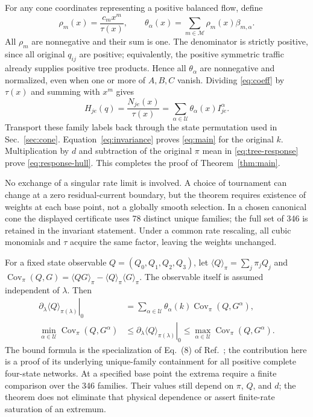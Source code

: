 \documentclass[11pt,a4paper]{article}
\DeclareMathOperator{\Cov}{Cov}
\newcommand{\U}{\mathcal U}
\begin{document}
For any cone coordinates representing a positive balanced flow, define
\begin{equation}
 \rho_m(x)=\frac{c_mx^m}{\tau(x)},\qquad
 \theta_\alpha(x)=\sum_{m\in\mathcal M}\rho_m(x)\beta_{m,\alpha}.
 \label{eq:weights}
\end{equation}
All $\rho_m$ are nonnegative and their sum is one. The denominator is
strictly positive, since all original $q_{ij}$ are positive; equivalently,
the positive symmetric traffic already supplies positive tree products.
Hence all $\theta_\alpha$ are nonnegative and normalized, even when one
or more of $A,B,C$ vanish. Dividing \eqref{eq:coeff} by $\tau(x)$ and
summing with $x^m$ gives
\begin{equation}
 H_{je}(q)=\frac{N_{je}(x)}{\tau(x)}
     =\sum_{\alpha\in\U}\theta_\alpha(x)I^\alpha_{je}.
 \label{eq:finish}
\end{equation}
Transport these family labels back through the state permutation used
in Sec.~\ref{sec:cone}. Equation~\eqref{eq:invariance} proves
\eqref{eq:main} for the original $k$. Multiplication by $d$ and subtraction
of the original $\pi$ mean in \eqref{eq:tree-response} prove
\eqref{eq:response-hull}. This completes the proof of
Theorem~\ref{thm:main}.

No exchange of a singular rate limit is involved. A choice of tournament
can change at a zero residual-current boundary, but the theorem requires
existence of weights at each base point, not a globally smooth selection.
In a chosen canonical cone the displayed certificate uses 78 distinct
unique families; the full set of 346 is retained in the invariant
statement. Under a common rate rescaling, all cubic monomials and
$\tau$ acquire the same factor, leaving the weights unchanged.

For a fixed state observable $Q=(Q_0,Q_1,Q_2,Q_3)$, let
$\langle Q\rangle_\pi=\sum_j\pi_jQ_j$ and
$\Cov_\pi(Q,G)=\langle QG\rangle_\pi-\langle Q\rangle_\pi
\langle G\rangle_\pi$. The observable itself is assumed independent
of $\lambda$. Then
\begin{align}
 \left.\partial_\lambda\langle Q\rangle_{\pi(\lambda)}\right|_0
 &=\sum_{\alpha\in\U}\theta_\alpha(k)\Cov_\pi(Q,G^\alpha),
 \label{eq:covmix}\\
 \min_{\alpha\in\U}\Cov_\pi(Q,G^\alpha)
 &\le\left.\partial_\lambda\langle Q\rangle_{\pi(\lambda)}\right|_0
 \le\max_{\alpha\in\U}\Cov_\pi(Q,G^\alpha).
 \label{eq:bounds}
\end{align}
The bound formula is the specialization of Eq.~(8) of
Ref.~\cite{FancherHorowitz2026}; the contribution here is a proof of its
underlying unique-family containment for all positive complete
four-state networks. At a specified base point the extrema require a
finite comparison over the 346 families. Their values still depend on
$\pi$, $Q$, and $d$; the theorem does not eliminate that physical
dependence or assert finite-rate saturation of an extremum.
\end{document}
